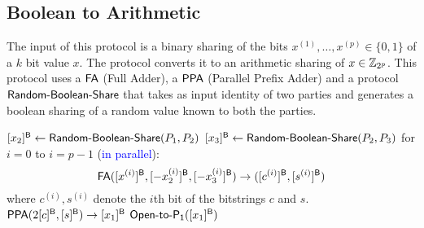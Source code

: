 
\subsection{Boolean to Arithmetic}
\begin{algorithm}[H]
\renewcommand{\thealgorithm}{}
\caption{$[\vec{x}]^\Boolean \rightarrow [x]^\Arithmetic$}
\label{protocol1}
The input of this protocol is a binary sharing of the bits $x^{(1)}, \ldots, x^{(p)} \in \{0, 1\}$ of a $k$ bit value $x$. The protocol converts it to an arithmetic sharing of $x \in \mathbb{Z}_{2^p}$. This protocol uses a $\mathsf{FA}$ (Full Adder), a $\mathsf{PPA}$ (Parallel Prefix Adder) and a protocol $\mathsf{Random\mbox{-}Boolean\mbox{-}Share}$ that takes as input identity of two parties and generates a boolean sharing of a random value known to both the parties.
\bigskip
\begin{algorithmic}[1]
\STATE $[x_2]^{\mathsf{B}} \leftarrow \mathsf{Random\mbox{-}Boolean\mbox{-}Share}(P_1, P_2)$
\STATE $[x_3]^{\mathsf{B}} \leftarrow \mathsf{Random\mbox{-}Boolean\mbox{-}Share}(P_2, P_3)$
\STATE for $i = 0$ to $i = p - 1$ (\textcolor{blue}{in parallel}):
\begin{equation*}
    \mathsf{FA}([x^{(i)}]^{\mathsf{B}}, [-x_2^{(i)}]^{\mathsf{B}}, [-x_3^{(i)}]^{\mathsf{B}}) \rightarrow ([c^{(i)}]^{\mathsf{B}}, [s^{(i)}]^{\mathsf{B}})
\end{equation*} 
where $c^{(i)}, s^{(i)}$ denote the $i$th bit of the bitstrings $c$ and $s$.
\medskip
\STATE $\mathsf{PPA}(2[c]^{\mathsf{B}}, [s]^{\mathsf{B}}) \rightarrow [x_1]^{\mathsf{B}}$ 
\STATE $\mathsf{Open\mbox{-}to\mbox{-}P_1}([x_1]^{\mathsf{B}})$
\end{algorithmic}
\end{algorithm}


